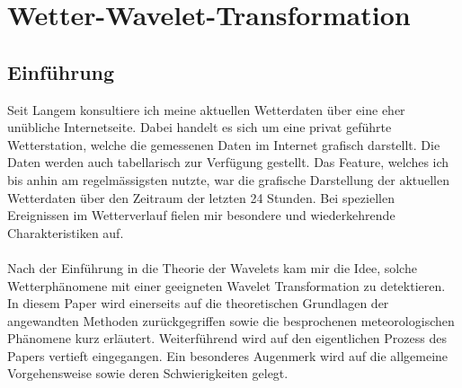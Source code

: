 %
%
%
\chapter{Wetter-Wavelet-Transformation\label{chapter:wwt}}
\begin{refsection}




\lstset{style=mystyle}


\section{Einführung}


Seit Langem konsultiere ich meine aktuellen Wetterdaten über eine eher unübliche Internetseite.
Dabei handelt es sich um eine privat geführte Wetterstation, welche die gemessenen Daten im Internet grafisch darstellt.
Die Daten werden auch tabellarisch zur Verfügung gestellt.
Das Feature, welches ich bis anhin am regelmässigsten nutzte, war die grafische Darstellung der aktuellen Wetterdaten über den Zeitraum der letzten 24 Stunden.
Bei speziellen Ereignissen im Wetterverlauf fielen mir besondere und wiederkehrende Charakteristiken auf.
\\
\\
Nach der Einführung in die Theorie der Wavelets kam mir die Idee, solche Wetterphänomene mit einer geeigneten Wavelet Transformation zu detektieren.
In diesem Paper wird einerseits auf die theoretischen Grundlagen der angewandten Methoden zurückgegriffen sowie die besprochenen meteorologischen Phänomene kurz erläutert. 
Weiterführend wird auf den eigentlichen Prozess des Papers vertieft eingegangen.
Ein besonderes Augenmerk wird auf die allgemeine Vorgehensweise sowie deren Schwierigkeiten gelegt.
\\





\end{refsection}
